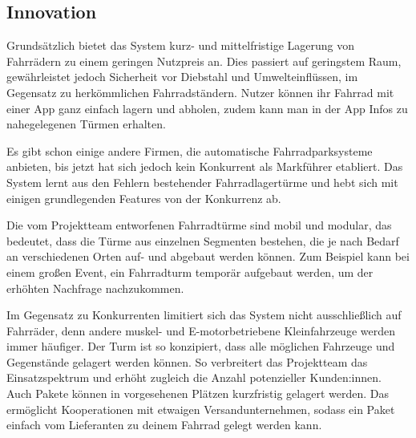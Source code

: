 \subsection{Innovation}

Grundsätzlich bietet das System kurz- und mittelfristige Lagerung von Fahrrädern zu einem geringen Nutzpreis an. Dies passiert auf geringstem Raum, gewährleistet jedoch Sicherheit vor Diebstahl und Umwelteinflüssen, im Gegensatz zu herkömmlichen Fahrradständern. Nutzer können ihr Fahrrad mit einer App ganz einfach lagern und abholen, zudem kann man in der App Infos zu nahegelegenen Türmen erhalten.

\bigskip

\noindent Es gibt schon einige andere Firmen, die automatische Fahrradparksysteme anbieten, bis jetzt hat sich jedoch kein Konkurrent als Markführer etabliert. Das System lernt aus den Fehlern bestehender Fahrradlagertürme und hebt sich mit einigen grundlegenden Features von der Konkurrenz ab.

\bigskip

\noindent Die vom Projektteam entworfenen Fahrradtürme sind mobil und modular, das bedeutet, dass die Türme aus einzelnen Segmenten bestehen, die je nach Bedarf an verschiedenen Orten auf- und abgebaut werden können. Zum Beispiel kann bei einem großen Event, ein Fahrradturm temporär aufgebaut werden, um der erhöhten Nachfrage nachzukommen.

\bigskip

\noindent Im Gegensatz zu Konkurrenten limitiert sich das System nicht ausschließlich auf Fahrräder, denn andere muskel- und E-motorbetriebene Kleinfahrzeuge werden immer häufiger. Der Turm ist so konzipiert, dass alle möglichen Fahrzeuge und Gegenstände gelagert werden können. So verbreitert das Projektteam das Einsatzspektrum und erhöht zugleich die Anzahl potenzieller Kunden:innen. Auch Pakete können in vorgesehenen Plätzen kurzfristig gelagert werden. Das ermöglicht Kooperationen mit etwaigen Versandunternehmen, sodass ein Paket einfach vom Lieferanten zu deinem Fahrrad gelegt werden kann.

